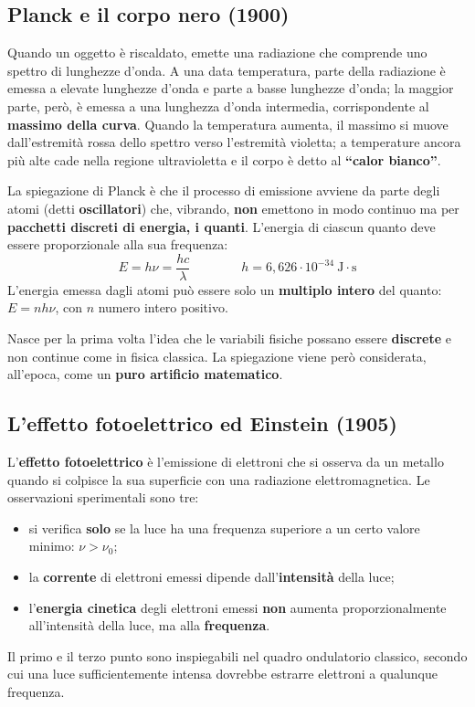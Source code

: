\documentclass[11pt, a4paper, openright]{book}
\begin{document}
\subsection{Planck e il corpo nero (1900)}
Quando un oggetto è riscaldato, emette una radiazione che comprende uno spettro di lunghezze d'onda. A una data temperatura, parte della radiazione è emessa a elevate lunghezze d'onda e parte a basse lunghezze d'onda; la maggior parte, però, è emessa a una lunghezza d'onda intermedia, corrispondente al \textbf{massimo della curva}. Quando la temperatura aumenta, il massimo si muove dall'estremità rossa dello spettro verso l'estremità violetta; a temperature ancora più alte cade nella regione ultravioletta e il corpo è detto al \textbf{``calor bianco''}.

La spiegazione di Planck è che il processo di emissione avviene da parte degli atomi (detti \textbf{oscillatori}) che, vibrando, \textbf{non} emettono in modo continuo ma per \textbf{pacchetti discreti di energia, i quanti}. L'energia di ciascun quanto deve essere proporzionale alla sua frequenza:
\[
E = h\nu = \frac{hc}{\lambda}
\qquad\qquad
h = 6{,}626 \cdot 10^{-34}\ \mathrm{J\cdot s}
\]
L'energia emessa dagli atomi può essere solo un \textbf{multiplo intero} del quanto: $E = n h \nu$, con $n$ numero intero positivo.

Nasce per la prima volta l'idea che le variabili fisiche possano essere \textbf{discrete} e non continue come in fisica classica. La spiegazione viene però considerata, all'epoca, come un \textbf{puro artificio matematico}.

\subsection{L'effetto fotoelettrico ed Einstein (1905)}
L'\textbf{effetto fotoelettrico} è l'emissione di elettroni che si osserva da un metallo quando si colpisce la sua superficie con una radiazione elettromagnetica. Le osservazioni sperimentali sono tre:
\begin{itemize}
    \item si verifica \textbf{solo} se la luce ha una frequenza superiore a un certo valore minimo: $\nu > \nu_0$;
    \item la \textbf{corrente} di elettroni emessi dipende dall'\textbf{intensità} della luce;
    \item l'\textbf{energia cinetica} degli elettroni emessi \textbf{non} aumenta proporzionalmente all'intensità della luce, ma alla \textbf{frequenza}.
\end{itemize}
Il primo e il terzo punto sono inspiegabili nel quadro ondulatorio classico, secondo cui una luce sufficientemente intensa dovrebbe estrarre elettroni a qualunque frequenza.
\end{document}
